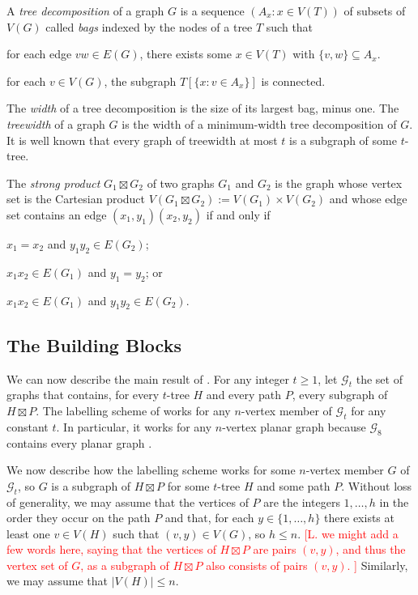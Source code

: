 \documentclass{patmorin}
\begin{document}
A \emph{tree decomposition} of a graph $G$ is a sequence $(A_x:x\in V(T))$ of subsets of $V(G)$ called \emph{bags} indexed by the nodes of a tree $T$ such that
\begin{inparaenum}[(i)]
    \item for each edge $vw\in E(G)$, there exists some $x\in V(T)$ with $\{v,w\}\subseteq A_x$.
    \item for each $v\in V(G)$, the subgraph $T[\{x:v\in A_x\}]$ is connected.
\end{inparaenum}
The \emph{width} of a tree decomposition is the size of its largest bag, minus one. The \emph{treewidth} of a graph $G$ is the width of a minimum-width tree decomposition of $G$.  It is well known that every graph of treewidth at most $t$ is a subgraph of some $t$-tree.

The \emph{strong product} $G_1\boxtimes G_2$ of two graphs $G_1$ and $G_2$ is the graph whose vertex set is the Cartesian product $V(G_1\boxtimes G_2):=V(G_1)\times V(G_2)$ and whose edge set contains an edge $(x_1,y_1)(x_2,y_2)$ if and only if
\begin{inparaenum}[(i)]
    \item $x_1=x_2$ and $y_1y_2\in E(G_2)$;
    \item $x_1x_2\in E(G_1)$ and $y_1=y_2$; or
    \item $x_1x_2\in E(G_1)$ and $y_1y_2\in E(G_2)$.
\end{inparaenum}


\subsection{The Building Blocks}

We can now describe the main result of \citet{dujmovic.esperet.ea:adjacency}.
For any integer $t\ge 1$, let $\mathcal{G}_t$ the set of graphs that contains, for every $t$-tree $H$ and every path $P$, every subgraph of $H\boxtimes P$.  The labelling scheme of \citet{dujmovic.esperet.ea:adjacency} works for any $n$-vertex member of $\mathcal{G}_t$ for any constant $t$.  In particular, it works for any $n$-vertex planar graph because $\mathcal{G}_8$ contains every planar graph \cite[Theorem~36]{dujmovic.joret.ea:planar}.

We now describe how the labelling scheme works for some $n$-vertex member $G$ of $\mathcal{G}_t$, so $G$ is a subgraph of $H\boxtimes P$ for some $t$-tree $H$ and some path $P$.  Without loss of generality, we may assume that the vertices of $P$ are the integers $1,\ldots,h$ in the order they occur on the path $P$ and that, for each $y\in\{1,\ldots,h\}$ there exists at least one $v\in V(H)$ such that $(v,y)\in V(G)$, so $h\le n$.  \textcolor{red}{[L. we might add a few words here, saying that the vertices of $H\boxtimes P$ are pairs $(v,y)$, and thus the vertex set of $G$, as a subgraph of $H\boxtimes P$ also consists of pairs $(v,y)$. ]} Similarly, we may assume that $|V(H)|\le n$.
\end{document}
